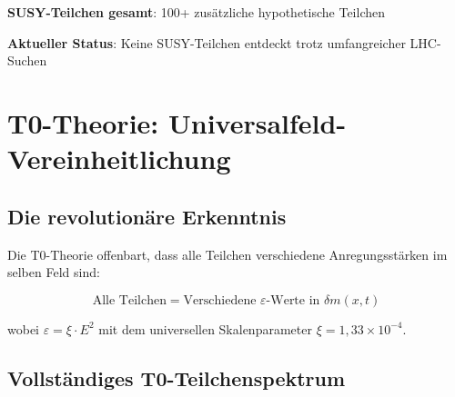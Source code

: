 \documentclass[12pt,a4paper]{article}
\newcommand{\deltam}{\delta m}
\newcommand{\xipar}{\xi}
\begin{document}
	\textbf{SUSY-Teilchen gesamt}: 100+ zusätzliche hypothetische Teilchen
	
	\textbf{Aktueller Status}: Keine SUSY-Teilchen entdeckt trotz umfangreicher LHC-Suchen
	
	\section{T0-Theorie: Universalfeld-Vereinheitlichung}
	
	\subsection{Die revolutionäre Erkenntnis}
	
	Die T0-Theorie offenbart, dass alle Teilchen verschiedene Anregungsstärken im selben Feld sind:
	
	\begin{equation}
		\boxed{\text{Alle Teilchen} = \text{Verschiedene } \varepsilon \text{-Werte in } \deltam(x,t)}
		\label{eq:universal_particle_principle}
	\end{equation}
	
	wobei $\varepsilon = \xipar \cdot E^2$ mit dem universellen Skalenparameter $\xipar = 1{,}33 \times 10^{-4}$.
	
	\subsection{Vollständiges T0-Teilchenspektrum}
	
\end{document}
